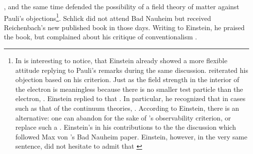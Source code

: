 \documentclass[draft]{article}
\renewcommand{\me}{;~m.e.{}}
\begin{document}
{}, and the same time defended the possibility of a field theory of matter against Pauli's objections\footnote{In is interesting to notice, that Einstein already showed a more flexible attitude replying to Pauli's remarks during the same discussion. \Pauli reiterated his objection based on his  criterion. Just as the field strength in the interior of the electron is meaningless because there is no smaller test particle than the electron,  \citep[650]{Einstein1920c}. Einstein replied to \Pauli that  \citep[650]{Einstein1920c}. In particular, he recognized that in cases such as that of the continuum theories,  \citep[650]{Einstein1920c}. According to Einstein, there is an alternative: one can abandon  for the sake of \Pauli's observability criterion, or replace such a  \citep[650]{Einstein1920c}.  Einstein's in his contributions to the the discussion which followed Max von 's Bad Nauheim paper. Einstein, however, in the very same sentence, did not hesitate to admit that  \citep[Einstein's reply to][662\me]{Laue1920}}.  Schlick did not attend Bad Nauheim but received Reichenbach's new published book in those days. Writing to Einstein, he praised the book, but complained about his critique of conventionalism . 
\end{document}
